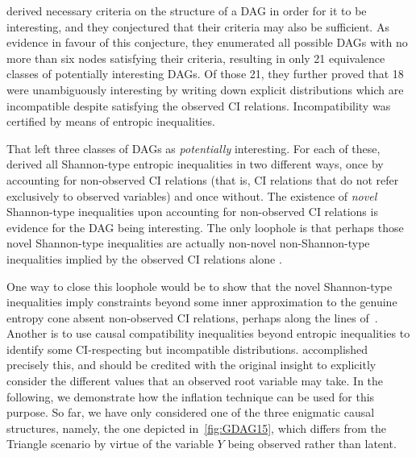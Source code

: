 \documentclass[aps,english,superscriptaddress,onecolumn,twoside,longbibliography,pra,floatfix,fleqn,nofootinbib]{revtex4-1}%
\theoremstyle{definition}
\begin{document}
\citet{pusey2014gdag} derived necessary criteria on the structure of a DAG in order for it to be interesting, and they conjectured that their criteria may also be sufficient. As evidence in favour of this conjecture, they enumerated all possible DAGs with no more than six nodes satisfying their criteria, resulting in 
only 21 equivalence classes of potentially interesting DAGs.
Of those 21, they further proved that 18 were unambiguously interesting by writing down explicit distributions which are incompatible despite satisfying the observed CI relations. Incompatibility was certified by means of entropic inequalities. 

That left three classes of DAGs  as \emph{potentially} interesting. For each of these, \citet{pusey2014gdag} derived all Shannon-type entropic inequalities in two different ways, once by accounting for non-observed CI relations (that is, CI relations that do not refer exclusively to observed variables) and once without. The existence of \emph{novel} Shannon-type inequalities upon accounting for non-observed CI relations is evidence for the DAG being interesting. The only loophole is that perhaps those novel Shannon-type inequalities are actually non-novel non-Shannon-type inequalities implied by the observed CI relations alone \cite{pusey2014gdag}. 

One way to close this loophole would be to show that the novel Shannon-type inequalities imply constraints beyond some inner approximation to the genuine entropy cone absent non-observed CI relations, perhaps along the lines of~\cite{weilenmann2016entropic}. Another is to use causal compatibility inequalities beyond entropic inequalities to identify some CI-respecting but incompatible distributions. \citet{pianaar2016interesting} accomplished precisely this, and should be credited with the original insight to explicitly consider the different values that an observed root variable may take. In the following, we demonstrate how the inflation technique can be used for this purpose. So far, we have only considered one of the three enigmatic causal structures, namely, the one depicted in~\cref{fig:GDAG15}, which differs from the Triangle scenario by virtue of the variable $Y$ being observed rather than latent.
\end{document}
